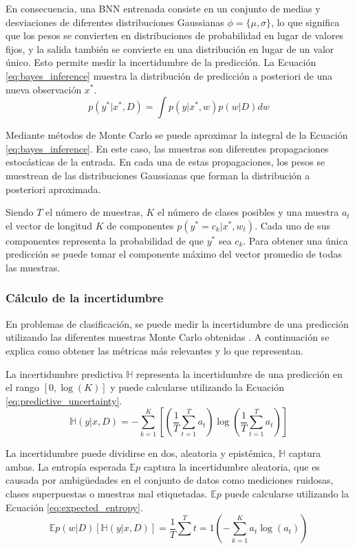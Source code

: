 En consecuencia, una BNN entrenada consiste en un conjunto de medias y desviaciones de diferentes distribuciones Gaussianas $\phi = \{\mu, \sigma\}$, lo que significa que los pesos se convierten en distribuciones de probabilidad en lugar de valores fijos, y la salida también se convierte en una distribución en lugar de un valor único. Esto permite medir la incertidumbre de la predicción. La Ecuación \ref{eq:bayes_inference} muestra la distribución de predicción a posteriori de una nueva observación $x^*$.
\begin{equation} \label{eq:bayes_inference}
p(y^*|x^*,D) = \int p(y|x^*,w) p(w|D) dw
\end{equation}

Mediante métodos de Monte Carlo se puede aproximar la integral de la Ecuación \ref{eq:bayes_inference}. En este caso, las muestras son diferentes propagaciones estocásticas de la entrada. En cada una de estas propagaciones, los pesos se muestrean de las distribuciones Gaussianas que forman la distribución a posteriori aproximada.

Siendo $T$ el número de muestras, $K$ el número de clases posibles y una muestra $a_t$ el vector de longitud $K$ de componentes $p(y^* = c_k | x^*, w_t)$. Cada uno de sus componentes representa la probabilidad de que $y^*$ sea $c_k$. Para obtener una única predicción se puede tomar el componente máximo del vector promedio de todas las muestras.

\subsubsection{Cálculo de la incertidumbre}

En problemas de clasificación, se puede medir la incertidumbre de una predicción utilizando las diferentes muestras Monte Carlo obtenidas \cite{uncertainty_metrics}. A continuación se explica como obtener las métricas más relevantes y lo que representan.

La incertidumbre predictiva $\mathbb{H}$ representa la incertidumbre de una predicción en el rango $[0, \log(K)]$ y puede calcularse utilizando la Ecuación \ref{eq:predictive_uncertainty}.
\begin{equation} \label{eq:predictive_uncertainty}
\mathbb{H}(y|x,D) = - \sum^K_{k=1} \left[ \left( \dfrac{1}{T} \sum^T_{t=1} a_t \right) \log\left( \dfrac{1}{T} \sum^T_{t=1} a_t \right) \right]
\end{equation}

La incertidumbre puede dividirse en dos, aleatoria y epistémica, $\mathbb{H}$ captura ambas. La entropía esperada $\mathbb{E}p$ captura la incertidumbre aleatoria, que es causada por ambigüedades en el conjunto de datos como mediciones ruidosas, clases superpuestas o muestras mal etiquetadas. $\mathbb{E}p$ puede calcularse utilizando la Ecuación \ref{eq:expected_entropy}.
\begin{equation} \label{eq:expected_entropy}
\mathbb{E}{p(w|D)}[\mathbb{H}(y|x,D)] = \dfrac{1}{T} \sum^T{t=1} \left( -\sum^K_{k=1} a_{t} \log(a_t) \right)
\end{equation}

